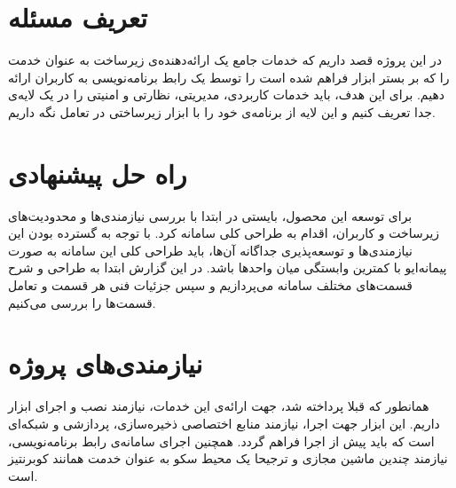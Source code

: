 \section{تعریف مسئله}
در این پروژه قصد داریم که خدمات جامع یک ارائه‌دهنده‌ی زیرساخت به عنوان خدمت را که بر بستر ابزار  فراهم شده است را توسط یک رابط برنامه‌نویسی به کاربران ارائه دهیم. برای این هدف، باید خدمات کاربردی، مدیریتی، نظارتی و امنیتی را در یک لایه‌ی جدا تعریف کنیم و این لایه از برنامه‌ی خود را با ابزار زیرساختی در تعامل نگه داریم. 
\section{راه حل پیشنهادی}
برای توسعه این محصول، بایستی در ابتدا با بررسی نیازمندی‌ها و محدودیت‌های زیرساخت و کاربران، اقدام به طراحی کلی سامانه کرد. با توجه به گسترده بودن این نیازمندی‌ها و توسعه‌پذیری جداگانه آن‌ها، باید طراحی کلی این سامانه به صورت پیمانه‌ایو با کمترین وابستگی میان واحد‌ها باشد. در این گزارش ابتدا به طراحی و شرح قسمت‌های مختلف سامانه می‌پردازیم و سپس جزئیات فنی هر قسمت و تعامل قسمت‌ها را بررسی می‌کنیم.
\section{نیازمندی‌های پروژه}
همانطور که قبلا پرداخته شد، جهت ارائه‌ی این خدمات، نیازمند نصب و اجرای ابزار  داریم. این ابزار جهت اجرا، نیازمند منابع اختصاصی ذخیره‌سازی، پردازشی و شبکه‌ای است که باید پیش از اجرا فراهم گردد. همچنین اجرای سامانه‌ی رابط برنامه‌نویسی، نیازمند چندین ماشین مجازی و  ترجیحا یک محیط سکو به عنوان خدمت همانند کوبرنتیز است.
